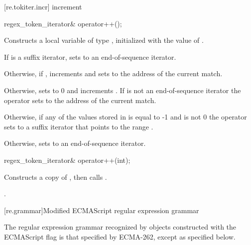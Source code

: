 [re.tokiter.incr]{ increment}

%
%
\begin{itemdecl}
regex_token_iterator& operator++(); 
\end{itemdecl}

\begin{itemdescr}
\pnum
\effects  Constructs a local variable  of
type , initialized with the value
of .

\pnum
If  is a suffix iterator, sets  to an
end-of-sequence iterator. 

\pnum
Otherwise, if , increments  and
sets  to the address of the current match.

\pnum
Otherwise, sets  to 0 and
increments . If  is not an
end-of-sequence iterator the operator sets  to the
address of the current match. 

\pnum
Otherwise, if any of the values stored in  is equal to -1 and
 is not 0 the operator sets  to a
suffix iterator that points to the range .

\pnum
Otherwise, sets  to an end-of-sequence iterator.

\returns  {}
\end{itemdescr}

%
%
\begin{itemdecl}
regex_token_iterator& operator++(int); 
\end{itemdecl}

\begin{itemdescr}
\pnum\effects  Constructs a copy  of , then calls .

\pnum\returns  {}.
\end{itemdescr}

[re.grammar]{Modified ECMAScript regular expression grammar}
%
%

\pnum
{}%
%
The regular expression grammar recognized by 
 objects constructed with the ECMAScript 
flag is that specified by ECMA-262, except as specified below.

